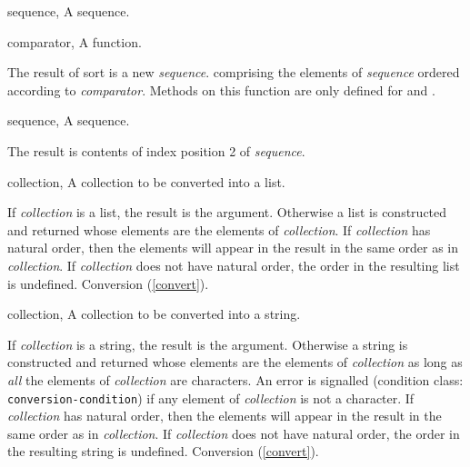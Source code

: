 \begin{optDefinition}
%
\begin{genericargs}
    \item[sequence, \classref{sequence}] A sequence.
    \item[comparator, \classref{function}] A function.
\end{genericargs}
%
\result%
 The result of sort is a new {\em sequence}. comprising the elements of
 {\em sequence\/} ordered according to {\em comparator}.
%
\remarks%
Methods on this function are only defined for  and .

%
\begin{genericargs}
    \item[sequence, \classref{sequence}] A sequence.
\end{genericargs}
%
\result%
The result is contents of index position 2 of {\em sequence}.

%
\begin{specargs}
    \item[collection, \classref{collection}] A collection to be converted into a
    list.
\end{specargs}
%
\result%
If {\em collection\/} is a list, the result is the argument.  Otherwise
a list is constructed and returned whose elements are the elements of {\em
    collection}.  If {\em collection\/} has natural order, then the elements
will appear in the result in the same order as in {\em collection}.  If {\em
    collection\/} does not have natural order, the order in the resulting list
is undefined.
%
\seealso%
Conversion (\ref{convert}).

%
\begin{specargs}
    \item[collection, \classref{collection}] A collection to be converted into a
    string.
\end{specargs}
%
\result%
If {\em collection\/} is a string, the result is the argument.
Otherwise a string is constructed and returned whose elements are the elements
of {\em collection\/} as long as {\em all\/} the elements of {\em collection\/}
are characters.  An error is signalled (condition class: {\tt
    conversion-condition}) if any element
of {\em collection\/} is not a character.  If {\em collection\/} has natural
order, then the elements will appear in the result in the same order as in {\em
    collection}.  If {\em collection\/} does not have natural order, the order
in the resulting string is undefined.
%
\seealso%
Conversion (\ref{convert}).


\end{optDefinition}
